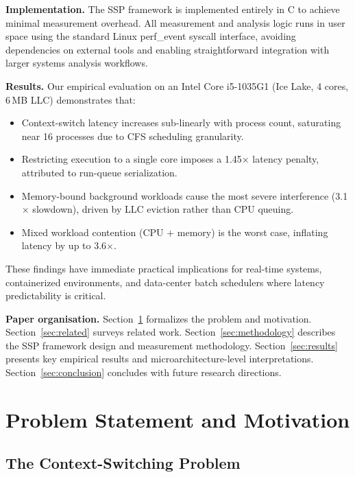 \documentclass[conference]{IEEEtran}
\begin{document}
\textbf{Implementation.} The SSP framework is implemented entirely in C to
achieve minimal measurement overhead. All measurement and analysis logic runs
in user space using the standard Linux perf\_event syscall interface, avoiding
dependencies on external tools and enabling straightforward integration with
larger systems analysis workflows.

\textbf{Results.} Our empirical evaluation on an Intel Core i5-1035G1 (Ice Lake,
4 cores, 6\,MB LLC) demonstrates that:

\begin{itemize}
  \item Context-switch latency increases sub-linearly with process count,
        saturating near 16 processes due to CFS scheduling granularity.
  \item Restricting execution to a single core imposes a 1.45$\times$ latency
        penalty, attributed to run-queue serialization.
  \item Memory-bound background workloads cause the most severe interference
        (3.1$\times$ slowdown), driven by LLC eviction rather than CPU queuing.
  \item Mixed workload contention (CPU + memory) is the worst case, inflating
        latency by up to 3.6$\times$.
\end{itemize}

These findings have immediate practical implications for real-time systems,
containerized environments, and data-center batch schedulers where latency
predictability is critical.

\textbf{Paper organisation.} Section~\ref{sec:problem} formalizes the problem
and motivation. Section~\ref{sec:related} surveys related work.
Section~\ref{sec:methodology} describes the SSP framework design and measurement
methodology. Section~\ref{sec:results} presents key empirical results and
microarchitecture-level interpretations. Section~\ref{sec:conclusion} concludes
with future research directions.

\section{Problem Statement and Motivation}
\label{sec:problem}

\subsection{The Context-Switching Problem}
\end{document}
